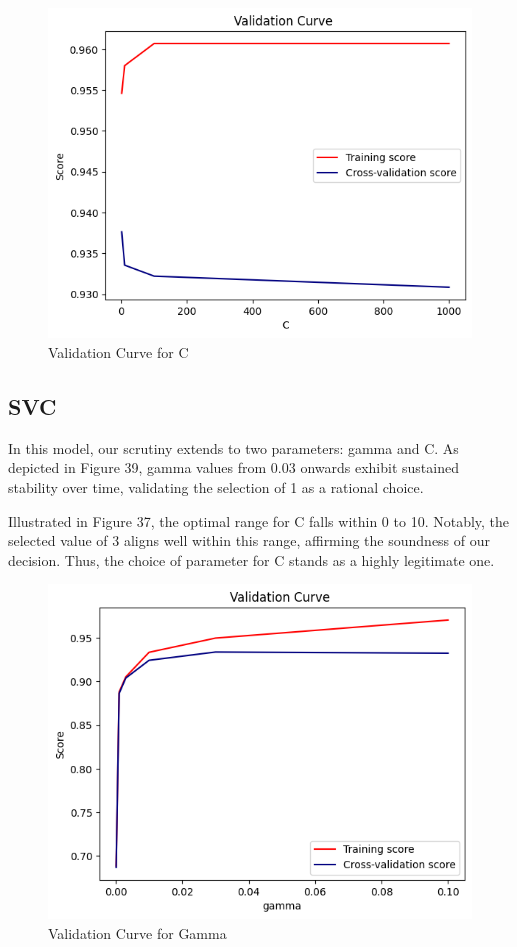 \documentclass[conference]{IEEEtran}
\begin{document}
\begin{figure}[H]
    \centering
    \includegraphics[width=1\linewidth]{images/ValidationCurveLRC.png}
    \caption{Validation Curve for C}
    \label{fig:NN-Confusion-AllFeatures}
\end{figure}

\subsection{SVC}

In this model, our scrutiny extends to two parameters: gamma and C. As depicted in Figure 39, gamma values from 0.03 onwards exhibit sustained stability over time, validating the selection of 1 as a rational choice.

Illustrated in Figure 37, the optimal range for C falls within 0 to 10. Notably, the selected value of 3 aligns well within this range, affirming the soundness of our decision. Thus, the choice of parameter for C stands as a highly legitimate one.

\begin{figure}[H]
    \centering
    \includegraphics[width=1\linewidth]{images/ValidationCurveSVCGamma.png}
    \caption{Validation Curve for Gamma}
    \label{fig:NN-Confusion-AllFeatures}
\end{figure}
\end{document}
